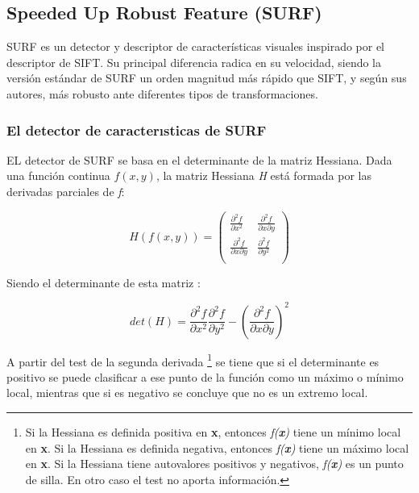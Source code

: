 \subsection{Speeded Up Robust Feature (SURF)}

SURF\cite{bay2008speeded} es un detector y descriptor de características visuales inspirado por el descriptor de SIFT\cite{Lowe04}. Su principal diferencia radica en su velocidad, siendo la versión estándar de SURF un orden magnitud más rápido que SIFT, y según sus autores, más robusto ante diferentes tipos de transformaciones.

\subsubsection{El detector de caracterısticas de SURF}
EL detector de SURF se basa en el determinante de la matriz Hessiana. Dada una función continua $ f(x, y) $, la matriz Hessiana \textit{H} está formada por las derivadas parciales de \textit{f}:

\begin{equation}
H(f(x, y)) =
\left(
\begin{array}{cc}
\frac{\partial^2 f}{\partial x^2} & \frac{\partial^2 f}{{\partial x}{\partial y}} \\
\frac{\partial^2 f}{{\partial x}{\partial y}} & \frac{\partial^2 f}{\partial y^2} \\
\end{array}
\right)
\end{equation}

Siendo el determinante de esta matriz :

\begin{equation}
det(H) = \frac{\partial^2 f}{\partial x^2} \frac{\partial^2 f}{\partial y^2}
	 - \left( \frac{\partial^2 f}{{\partial x}{\partial y}} \right)^ 2
\end{equation}

A partir del test de la segunda derivada
\footnote{Si la Hessiana es definida positiva en \textbf{x}, entonces \textit{f(\textbf{x})} tiene un mínimo local en \textbf{x}. Si la Hessiana es definida negativa, entonces \textit{f(\textbf{x})} tiene un máximo local en \textbf{x}. Si la Hessiana tiene autovalores positivos y negativos, \textit{f(\textbf{x})} es un punto de silla. En otro caso el test no aporta información.}
se tiene que si el determinante es positivo se puede clasificar a ese punto de la función como un máximo o mínimo local, mientras que si es negativo se concluye que no es un extremo local.

